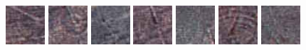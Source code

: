 \documentclass[a4paper,11pt]{article}
\begin{document}
\begin{figure}[h!]
\includegraphics[width=0.13\textwidth]{img/regiones/C2_50x50_01.png}
\includegraphics[width=0.13\textwidth]{img/regiones/C2_50x50_02.png}
\includegraphics[width=0.13\textwidth]{img/regiones/C2_50x50_03.png}
\includegraphics[width=0.13\textwidth]{img/regiones/C2_50x50_04.png}
\includegraphics[width=0.13\textwidth]{img/regiones/C2_50x50_05.png}
\includegraphics[width=0.13\textwidth]{img/regiones/C2_50x50_06.png}
\includegraphics[width=0.13\textwidth]{img/regiones/C2_50x50_07.png}
\vspace{0.5cm}


\end{figure}
\end{document}
